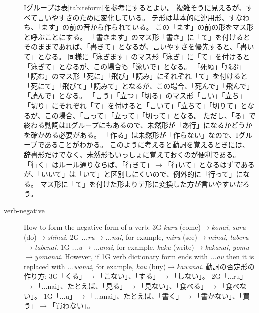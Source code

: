 \documentclass[uplatex,dvipdfmx,b5paper,english,10pt]{jsbook}
\begin{document}
\begin{description}
Iグループは表\ref{tab:teform}を参考にするとよい。
複雑そうに見えるが、すべて言いやすさのために変化している。
テ形は基本的に連用形、すなわち、「ます」の前の音から作られている。
この「ます」の前の形をマス形と呼ぶことにする。
「書きます」のマス形「書き」に「て」を付けるとそのままであれば、「書きて」となるが、言いやすさを優先すると、「書いて」となる。
同様に「泳ぎます」のマス形「泳ぎ」に「て」を付けると「泳ぎて」となるが、この場合も「泳いで」となる。
「死ぬ」「飛ぶ」「読む」のマス形「死に」「飛び」「読み」にそれぞれ「て」を付けると「死にて」「飛びて」「読みて」となるが、この場合、「死んで」「飛んで」「読んで」となる。
「言う」「立つ」「切る」のマス形「言い」「立ち」「切り」にそれぞれ「て」を付けると「言いて」「立ちて」「切りて」となるが、この場合、「言って」「立って」「切って」となる。
ただし、「る」で終わる動詞はIIグループにもあるので、未然形が「あ行」になるかどうかを確かめる必要がある。
「作る」は未然形が「作らない」なので、Iグループであることがわかる。
このように考えると動詞を覚えるときには、辞書形だけでなく、未然形もいっしょに覚えておくのが便利である。
「行く」はルール通りならば、「行きて」$\rightarrow$「行いて」となるはずであるが、「いいて」は「いて」と区別しにくいので、例外的に「行って」になる。
マス形に「て」を付けた形よりテ形に変換した方が言いやすいだろう。
\fi

\item[verb-negative]
\label{gn:verb-negative}
\ifEnglish
How to form the negative form of a verb:
3G {\it kuru\/} (come)$\rightarrow${\it konai\/}, {\it suru\/} (do)$\rightarrow${\it shinai\/}.
2G {\it ...ru\/}$\rightarrow${\it ...nai\/}, for example, {\it miru\/} (see)$\rightarrow${\it minai\/}, {\it taberu\/}$\rightarrow${\it tabenai\/}.
1G {\it ...u\/}$\rightarrow${\it ...anai\/}, for example, {\it kaku\/} (write)$\rightarrow${\it kakanai\/}, {\it yomu\/}$\rightarrow${\it yomanai\/}. However, if 1G verb dictionary form ends with {\it ...au\/} then it is replaced with {\it ...wanai\/}, for example, {\it kau\/} (buy)$\rightarrow${\it kawanai\/}.
\else
動詞の否定形の作り方:
  3G「くる」$\rightarrow$「こない」、「する」$\rightarrow$「しない」。
  2G「...ru」$\rightarrow$「...nai」、たとえば、「見る」$\rightarrow$「見ない」、「食べる」$\rightarrow$「食べない」。
  1G「...u」$\rightarrow$「...anai」、たとえば、「書く」$\rightarrow$「書かない」、「買う」$\rightarrow$「買わない」。
\fi


\end{description}
\end{document}
